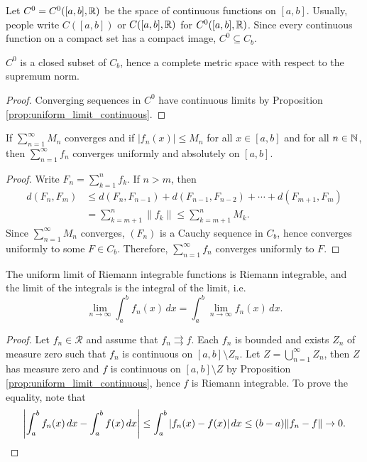 Let $C^0 = C^0([a, b], {\mathbb R})$ be the space of continuous functions on $[a, b]$. Usually, people write $C([a, b])$ or $C([a, b], {\mathbb R})$ for $C^0([a, b], {\mathbb R})$. Since every continuous function on a compact set has a compact image, $C^0 \subseteq C_b$. 

\begin{cl}
    $C^0$ is a closed subset of $C_b$, hence a complete metric space with respect to the supremum norm.
    \begin{proof}
        Converging sequences in $C^0$ have continuous limits by Proposition \ref{prop:uniform_limit_continuous}.
    \end{proof}
\end{cl}

\begin{prop}
    If $\sum_{n=1}^\infty M_n$ converges and if $|f_n(x)| \leq M_n$ for all $x \in [a, b]$ and for all $n \in {\mathbb N}$, then $\sum_{n=1}^\infty f_n$ converges uniformly and absolutely on $[a, b]$.
    \begin{proof}
        Write $F_n = \sum_{k=1}^n f_k$. If $n > m$, then
        \begin{align*}
            d(F_n, F_m) &\leq d(F_n, F_{n-1}) + d(F_{n-1}, F_{n-2}) + \cdots + d(F_{m+1}, F_m) \\
            &= \sum_{k=m+1}^n \|f_k\| \leq \sum_{k=m+1}^n M_k.
        \end{align*}
        Since $\sum_{n=1}^\infty M_n$ converges, $(F_n)$ is a Cauchy sequence in $C_b$, hence converges uniformly to some $F \in C_b$. Therefore, $\sum_{n=1}^\infty f_n$ converges uniformly to $F$.
    \end{proof}
\end{prop}

\begin{prop}
    The uniform limit of Riemann integrable functions is Riemann integrable, and the limit of the integrals is the integral of the limit, i.e.
    \[
    \lim_{n \to \infty} \int_a^b f_n(x) \, dx = \int_a^b \lim_{n \to \infty} f_n(x) \, dx.
    \]
    \begin{proof}
        Let $f_n \in \mathcal R$ and assume that $f_n \rightrightarrows f$. Each $f_n$ is bounded and exists $Z_n$ of measure zero such that $f_n$ is continuous on $[a, b] \setminus Z_n$. Let $Z = \bigcup_{n=1}^\infty Z_n$, then $Z$ has measure zero and $f$ is continuous on $[a, b] \setminus Z$ by Proposition \ref{prop:uniform_limit_continuous}, hence $f$ is Riemann integrable. To prove the equality, note that
        \[
        {\left| \int_a^b f_n(x) \, dx - \int_a^b f(x) \, dx \right|} \leq \int_a^b |f_n(x) - f(x)| \, dx \leq (b - a) \|f_n - f\| \to 0.
        \]
    \end{proof}
\end{prop}

